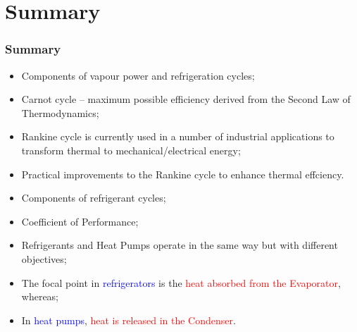 \documentclass[10pt,compress]{beamer}
\begin{document}
\begin{frame}
\begin{columns}
\begin{column}[c]{0.55\linewidth}
\begin{figure}
\begin{center}
       \vspace{-.5cm}
     \end{center}
    \end{figure}  
   \end{column}  
  \end{columns}
\end{frame}



\section{Summary}
\begin{frame}
 \frametitle{Summary}
  \begin{itemize}
   \item <1-> Components of vapour power and refrigeration cycles;
   \item <2-> Carnot cycle -- maximum possible efficiency derived from the Second Law of Thermodynamics;
   \item <3-> Rankine cycle is currently used in a number of industrial applications to transform thermal to mechanical/electrical energy;
   \item <4-> Practical improvements to the Rankine cycle to enhance thermal effciency.
   \item <5-> Components of refrigerant cycles;
   \item <6-> Coefficient of Performance;
   \item <7-> Refrigerants and Heat Pumps operate in the same way but with different objectives;
   \item <8-> The focal point in \textcolor{blue}{refrigerators} is the \textcolor{red}{heat absorbed from the Evaporator}, whereas;
   \item <9-> In \textcolor{blue}{heat pumps}, \textcolor{red}{heat is released in the Condenser}.
  \end{itemize}
\end{frame}
\end{document}
